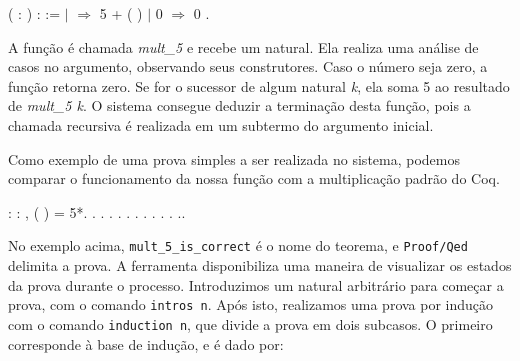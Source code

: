 \bigskip
\coqdocnoindent {}  ( :
) :  :=\coqdoceol \coqdocindent{2.00em}
  \coqdoceol \coqdocindent{2.00em}
\ensuremath{|}   \ensuremath{\Rightarrow} 5 +
( )\coqdoceol \coqdocindent{2.00em}
\ensuremath{|} 0   \ensuremath{\Rightarrow} 0\coqdoceol \coqdocindent{2.00em}
.\coqdoceol \coqdocemptyline
\bigskip

A função é chamada \emph{mult\_5} e recebe um natural. Ela realiza uma
análise de casos no argumento, observando seus construtores. Caso o número seja
zero, a função retorna zero. Se for o sucessor de algum natural \emph{k}, ela
soma 5 ao resultado de \emph{mult\_5 k}. O sistema consegue deduzir a
terminação desta função, pois a chamada recursiva é realizada em um subtermo do
argumento inicial.

Como exemplo de uma prova simples a ser realizada no sistema, podemos comparar
o funcionamento da nossa função com a multiplicação padrão do Coq.

\bigskip
\coqdocnoindent
{} :
\coqdockw{\ensuremath{\forall}}  : ,
( ) = 5*.\coqdoceol \coqdocnoindent
{}.\coqdoceol \coqdocindent{2.00em} .\coqdoceol
\coqdocindent{2.00em}  .\coqdoceol
\coqdocindent{2.00em} . .\coqdoceol
\coqdocindent{2.00em}  .\coqdoceol
\coqdocindent{2.00em}  .\coqdoceol
\coqdocindent{2.00em} .\coqdoceol \coqdocindent{2.00em}
 .\coqdoceol \coqdocindent{2.00em}
 .\coqdoceol \coqdocindent{2.00em}
.\coqdoceol \coqdocnoindent {}.\coqdoceol
\bigskip

No exemplo acima, \texttt{mult\_5\_is\_correct} é o nome do teorema, e
\texttt{Proof/Qed} delimita a prova.  A ferramenta disponibiliza uma maneira de
visualizar os estados da prova durante o processo. Introduzimos um natural
arbitrário para começar a prova, com o comando \texttt{intros n}. Após isto,
realizamos uma prova por indução com o comando \texttt{induction n}, que divide
a prova em dois subcasos. O primeiro corresponde à base de indução, e é dado
por:

